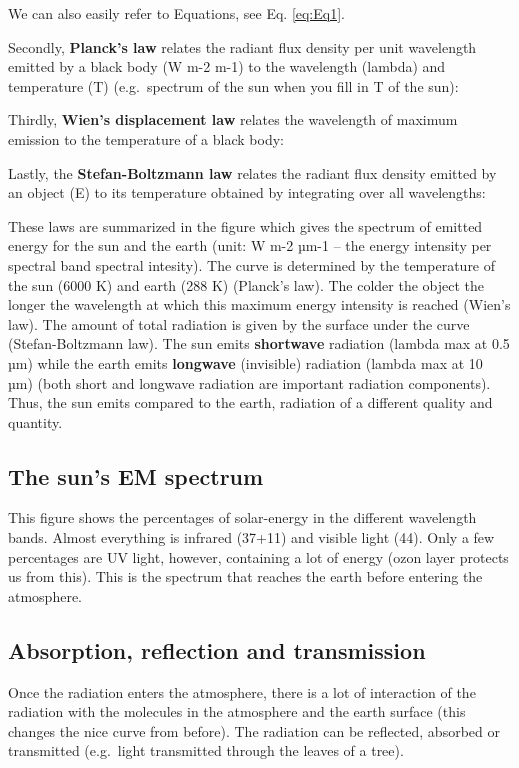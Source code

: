 \documentclass[oneside]{book}
\begin{document}
We can also easily refer to Equations, see Eq. \eqref{eq:Eq1}.

Secondly, \textbf{Planck's law} relates the radiant flux density per
unit wavelength emitted by a black body (W m-2 m-1) to the wavelength
(lambda) and temperature (T) (e.g.~spectrum of the sun when you fill in
T of the sun):

Thirdly, \textbf{Wien's displacement law} relates the wavelength of
maximum emission to the temperature of a black body:

Lastly, the \textbf{Stefan-Boltzmann law} relates the radiant flux
density emitted by an object (E) to its temperature obtained by
integrating over all wavelengths:

These laws are summarized in the figure which gives the spectrum of
emitted energy for the sun and the earth (unit: W m-2 µm-1 -- the energy
intensity per spectral band spectral intesity). The curve is determined
by the temperature of the sun (6000 K) and earth (288 K) (Planck's law).
The colder the object the longer the wavelength at which this maximum
energy intensity is reached (Wien's law). The amount of total radiation
is given by the surface under the curve (Stefan-Boltzmann law). The sun
emits \textbf{shortwave} radiation (lambda max at 0.5 µm) while the
earth emits \textbf{longwave} (invisible) radiation (lambda max at 10
µm) (both short and longwave radiation are important radiation
components). Thus, the sun emits compared to the earth, radiation of a
different quality and quantity.

\subsection{The sun's EM spectrum}\label{the-suns-em-spectrum}

This figure shows the percentages of solar-energy in the different
wavelength bands. Almost everything is infrared (37+11) and visible
light (44). Only a few percentages are UV light, however, containing a
lot of energy (ozon layer protects us from this). This is the spectrum
that reaches the earth before entering the atmosphere.

\subsection{Absorption, reflection and
transmission}\label{absorption-reflection-and-transmission}

Once the radiation enters the atmosphere, there is a lot of interaction
of the radiation with the molecules in the atmosphere and the earth
surface (this changes the nice curve from before). The radiation can be
reflected, absorbed or transmitted (e.g.~light transmitted through the
leaves of a tree).
\end{document}
